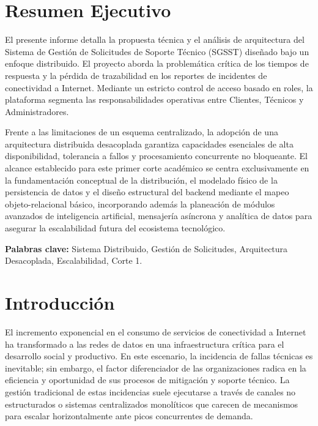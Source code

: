 \documentclass[12pt,letterpaper]{article}
\begin{document}
\newpage
\tableofcontents 
\newpage

\section{Resumen Ejecutivo}
El presente informe detalla la propuesta técnica y el análisis de arquitectura del Sistema de Gestión de Solicitudes de Soporte Técnico (SGSST) diseñado bajo un enfoque distribuido. El proyecto aborda la problemática crítica de los tiempos de respuesta y la pérdida de trazabilidad en los reportes de incidentes de conectividad a Internet. Mediante un estricto control de acceso basado en roles, la plataforma segmenta las responsabilidades operativas entre Clientes, Técnicos y Administradores. 

Frente a las limitaciones de un esquema centralizado, la adopción de una arquitectura distribuida desacoplada garantiza capacidades esenciales de alta disponibilidad, tolerancia a fallos y procesamiento concurrente no bloqueante. El alcance establecido para este primer corte académico se centra exclusivamente en la fundamentación conceptual de la distribución, el modelado físico de la persistencia de datos y el diseño estructural del backend mediante el mapeo objeto-relacional básico, incorporando además la planeación de módulos avanzados de inteligencia artificial, mensajería asíncrona y analítica de datos para asegurar la escalabilidad futura del ecosistema tecnológico.

\textbf{Palabras clave:} Sistema Distribuido, Gestión de Solicitudes, Arquitectura Desacoplada, Escalabilidad, Corte 1.

\newpage
\section{Introducción}
El incremento exponencial en el consumo de servicios de conectividad a Internet ha transformado a las redes de datos en una infraestructura crítica para el desarrollo social y productivo. En este escenario, la incidencia de fallas técnicas es inevitable; sin embargo, el factor diferenciador de las organizaciones radica en la eficiencia y oportunidad de sus procesos de mitigación y soporte técnico. La gestión tradicional de estas incidencias suele ejecutarse a través de canales no estructurados o sistemas centralizados monolíticos que carecen de mecanismos para escalar horizontalmente ante picos concurrentes de demanda.
\end{document}
